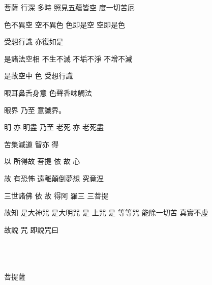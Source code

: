 菩薩
行深
多時
照見五蘊皆空
度一切苦厄

色不異空
空不異色
色即是空
空即是色

受想行識
亦復如是

是諸法空相
不生不滅
不垢不淨
不增不減

是故空中
色
受想行識

眼耳鼻舌身意
色聲香味觸法

眼界
乃至
意識界。

明
亦
明盡
乃至
老死
亦
老死盡

苦集滅道
智亦
得

以
所得故
菩提
依
故
心

故
有恐怖
遠離顛倒夢想
究竟涅

三世諸佛
依
故
得阿
羅三
三菩提

故知
是大神咒
是大明咒
是
上咒
是
等等咒
能除一切苦
真實不虛

故說
咒
即說咒曰

\vspace{1em}
\begin{center}
\Large
{}
\\
\\
\\
菩提薩
\end{center}